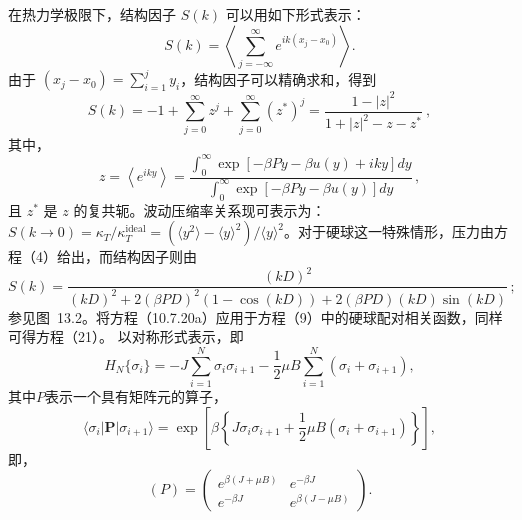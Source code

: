 在热力学极限下，结构因子 \(S(k)\) 可以用如下形式表示：
\begin{equation}\tag{13.1.16}\label{eq:13.1.16}
S ( k ) = \left\langle \sum _ { j = - \infty } ^{\infty} e ^{i k ( x _ { j} - x _ { 0 } ) } \right\rangle .
\end{equation}
由于 \((x_j - x_0) = \sum_{i=1}^{j} y_i\)，结构因子可以精确求和，得到
\begin{equation}\tag{13.1.17}\label{eq:13.1.17}
S ( k ) = - 1 + \sum _ { j = 0 } ^{\infty} z ^{j} + \sum _ { j = 0 } ^{\infty} ( z ^{*} ) ^{j} = \frac { 1 - | z | ^{2} } { 1 + | z | ^{2} - z - z ^{*} } \ ,
\end{equation}
其中，
\begin{equation}\tag{13.1.18}\label{eq:13.1.18}
z = \left\langle e ^{i k y} \right\rangle = \frac { \int _ { 0 } ^{\infty} \exp \left[ - \beta P y - \beta u ( y ) + i k y \right] d y } { \int _ { 0 } ^{\infty} \exp \left[ - \beta P y - \beta u ( y ) \right] d y } \, ,
\end{equation}
且 \(z^{*}\) 是 \(z\) 的复共轭。波动压缩率关系现可表示为：\(S(k\to0)=\kappa_{T}/\kappa_{T}^{\mathrm{ideal}}=\left(\langle y^{2}\rangle-\langle y\rangle^{2}\right)/\langle y\rangle^{2}\)。对于硬球这一特殊情形，压力由方程（4）给出，而结构因子则由
\begin{equation}\tag{13.1.19}\label{eq:13.1.19}
S ( k ) = \frac { ( k D ) ^{2} } { ( k D ) ^{2} + 2 ( \beta P D ) ^{2} ( 1 - \cos ( k D ) ) + 2 ( \beta P D ) ( k D ) \sin ( k D ) } \, ;
\end{equation}
参见图~13.2。将方程（10.7.20a）应用于方程（9）中的硬球配对相关函数，同样可得方程（21）。
以对称形式表示，即
\begin{equation}\tag{13.1.20}\label{eq:13.1.20}
H _ { N } \{ \sigma _ { i } \} = - J \sum _ { i = 1 } ^{N} \sigma _ { i } \sigma _ { i + 1 } - \frac { 1 } { 2 } \mu B \sum _ { i = 1 } ^{N} ( \sigma _ { i } + \sigma _ { i + 1 } ) ,
\end{equation}
其中\(P\)表示一个具有矩阵元的算子，
\begin{equation}\tag{13.1.21}\label{eq:13.1.21}
\langle \sigma _ { i } | \boldsymbol { P } | \sigma _ { i + 1 } \rangle = \exp \left[ \beta \left\{ J \sigma _ { i } \sigma _ { i + 1 } + \frac { 1 } { 2 } \mu B ( \sigma _ { i } + \sigma _ { i + 1 } ) \right\} \right] ,
\end{equation}
即，
\begin{equation}\tag{13.1.22}\label{eq:13.1.22}
( P ) = \left( \begin{array}{cc} { { e ^{\beta ( J + \mu B )} } } & { { e ^{- \beta J} } } \\{ { e ^{- \beta J} } } & { { e ^{\beta ( J - \mu B )} } } \end{array} \right) .
\end{equation}
